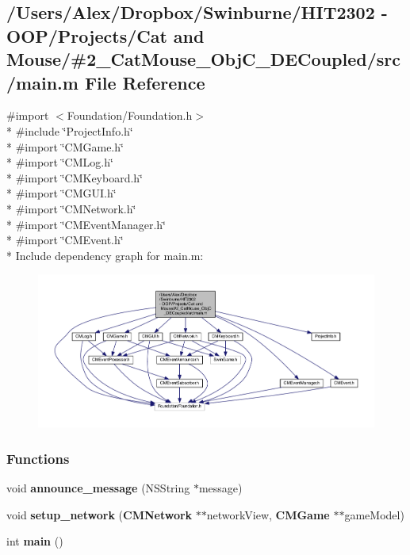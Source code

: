 \subsection{/\-Users/\-Alex/\-Dropbox/\-Swinburne/\-H\-I\-T2302 -\/ O\-O\-P/\-Projects/\-Cat and Mouse/\#2\-\_\-\-Cat\-Mouse\-\_\-\-Obj\-C\-\_\-\-D\-E\-Coupled/src/main.m File Reference}
\label{main_8m}
{\ttfamily \#import $<$Foundation/\-Foundation.\-h$>$}\\*
{\ttfamily \#include \char`\"{}Project\-Info.\-h\char`\"{}}\\*
{\ttfamily \#import \char`\"{}C\-M\-Game.\-h\char`\"{}}\\*
{\ttfamily \#import \char`\"{}C\-M\-Log.\-h\char`\"{}}\\*
{\ttfamily \#import \char`\"{}C\-M\-Keyboard.\-h\char`\"{}}\\*
{\ttfamily \#import \char`\"{}C\-M\-G\-U\-I.\-h\char`\"{}}\\*
{\ttfamily \#import \char`\"{}C\-M\-Network.\-h\char`\"{}}\\*
{\ttfamily \#import \char`\"{}C\-M\-Event\-Manager.\-h\char`\"{}}\\*
{\ttfamily \#import \char`\"{}C\-M\-Event.\-h\char`\"{}}\\*
Include dependency graph for main.\-m\-:
\nopagebreak
\begin{figure}[H]
\begin{center}
\leavevmode
\includegraphics[width=350pt]{main_8m__incl}
\end{center}
\end{figure}
\subsubsection*{Functions}
\begin{DoxyCompactItemize}
\item 
void {\bf announce\-\_\-message} (N\-S\-String $\ast$message)
\item 
void {\bf setup\-\_\-network} ({\bf C\-M\-Network} $\ast$$\ast$network\-View, {\bf C\-M\-Game} $\ast$$\ast$game\-Model)
\item 
int {\bf main} ()
\end{DoxyCompactItemize}


